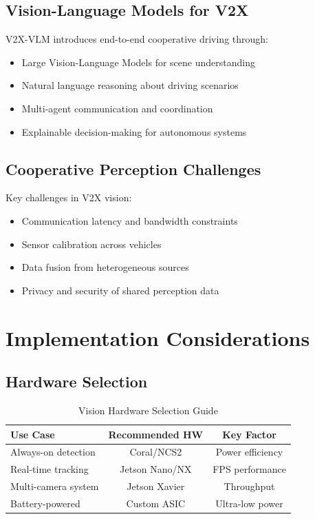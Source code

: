 \documentclass[12pt,a4paper]{article}
\begin{document}
\subsection{Vision-Language Models for V2X}

V2X-VLM introduces end-to-end cooperative driving through:
\begin{itemize}
    \item Large Vision-Language Models for scene understanding
    \item Natural language reasoning about driving scenarios
    \item Multi-agent communication and coordination
    \item Explainable decision-making for autonomous systems
\end{itemize}

\subsection{Cooperative Perception Challenges}

Key challenges in V2X vision:
\begin{itemize}
    \item Communication latency and bandwidth constraints
    \item Sensor calibration across vehicles
    \item Data fusion from heterogeneous sources
    \item Privacy and security of shared perception data
\end{itemize}

\section{Implementation Considerations}

\subsection{Hardware Selection}

\begin{table}[H]
\centering
\caption{Vision Hardware Selection Guide}
\begin{tabular}{lcc}
\toprule
\textbf{Use Case} & \textbf{Recommended HW} & \textbf{Key Factor} \\
\midrule
Always-on detection & Coral/NCS2 & Power efficiency \\
Real-time tracking & Jetson Nano/NX & FPS performance \\
Multi-camera system & Jetson Xavier & Throughput \\
Battery-powered & Custom ASIC & Ultra-low power \\
\bottomrule
\end{tabular}
\end{table}
\end{document}
